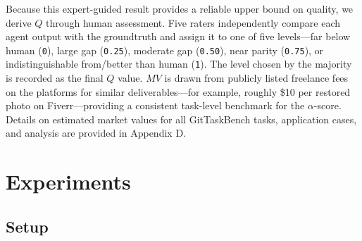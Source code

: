 \documentclass[letterpaper]{article} %
\begin{document}
Because this expert-guided result provides a reliable upper bound on quality, we derive \(Q\) through human assessment. Five raters independently compare each agent output with the groundtruth and assign it to one of five levels—far below human (\texttt{0}), large gap (\texttt{0.25}), moderate gap (\texttt{0.50}), near parity (\texttt{0.75}), or indistinguishable from/better than human (\texttt{1}). The level chosen by the majority is recorded as the final \(Q\) value. 
\(MV\) is drawn from publicly listed freelance fees on the platforms 
\cite{upwork, fiverr, freelancer}
for similar deliverables—for example, roughly \$10 per restored photo on Fiverr—providing a consistent task-level benchmark for the \(\alpha\)-score. 
Details on estimated market values for all GitTaskBench tasks, application cases, and analysis are provided in Appendix D.



\section{Experiments} %

\subsection{Setup}
\end{document}
